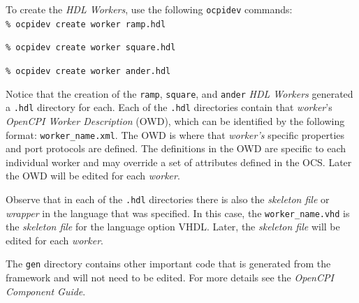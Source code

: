 To create the \textit{HDL Workers}, use the following \verb+ocpidev+ commands:\\

\forceindent\verb+% ocpidev create worker ramp.hdl+

\forceindent\verb+% ocpidev create worker square.hdl+

\forceindent\verb+% ocpidev create worker ander.hdl+\\

\OcpidevCreate{}

Notice that the creation of the \verb+ramp+, \verb+square+, and \verb+ander+ \textit{HDL Workers} generated a \verb+.hdl+ directory for each. Each of the \verb+.hdl+ directories contain that \textit{worker}'s \textit{OpenCPI Worker Description} (OWD), which can be identified by the following format: \verb+worker_name.xml+. The OWD is where that \textit{worker's} specific properties and port protocols are defined. The definitions in the OWD are specific to each individual worker and may override a set of attributes defined in the OCS. Later the OWD will be edited for each \textit{worker}.\newline

Observe that in each of the \verb+.hdl+ directories there is also the \textit{skeleton file} or \textit{wrapper} in the language that was specified. In this case, the \verb+worker_name.vhd+ is the \textit{skeleton file} for the language option VHDL. Later, the \textit{skeleton file} will be edited for each \textit{worker}.\newline

The \verb+gen+ directory contains other important code that is generated from the framework and will not need to be edited. For more details see the \textit{OpenCPI Component Guide}.\\

